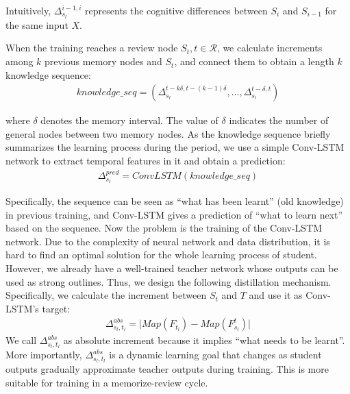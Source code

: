 \documentclass[letterpaper]{article} %
\begin{document}
Intuitively, $\Delta^{i-1,i}_{s_{l}}$ represents the cognitive differences between $S_{i}$ and $S_{i-1}$ for the same input $X$. 

When the training reaches a review node $S_{t},t\in\mathcal{R}$, we calculate increments among $k$ previous memory nodes and $S_{t}$, and connect them to obtain a length $k$ knowledge sequence:
\begin{align}
    knowledge\_seq = (\Delta^{t-k\delta,t-(k-1)\delta}_{s_{l}},\dots,\Delta^{t-\delta,t}_{s_{l}})
\end{align}


\noindent where $\delta$ denotes the memory interval. The value of $\delta$ indicates the number of general nodes between two memory nodes. As the knowledge sequence briefly summarizes the learning process during the period, we use a simple Conv-LSTM network to extract temporal features in it and obtain a prediction:  
\begin{align}
    \Delta_{s_{l}}^{pred} = ConvLSTM(knowledge\_seq)
\end{align}

Specifically, the sequence can be seen as ``what has been learnt'' (old knowledge) in previous training, and Conv-LSTM gives a prediction of ``what to learn next'' based on the sequence. Now the problem is the training of the Conv-LSTM network. Due to the complexity of neural network and data distribution, it is hard to find an optimal solution for the whole learning process of student. However, we already have a well-trained teacher network whose outputs can be used as strong outlines. Thus, we design the following distillation mechanism. Specifically, we calculate the increment between $S_{t}$ and $T$ and use it as Conv-LSTM's target:
\begin{align}
    \Delta^{abs}_{s_{l},t_{l}} = \Big|Map(F_{t_{l}})-Map(F_{s_{l}}^{t})\Big|
\end{align}
We call $\Delta^{abs}_{s_{l},t_{l}}$ as absolute increment because it implies ``what needs to be learnt''. More importantly, $\Delta^{abs}_{s_{l},t_{l}}$ is a dynamic learning goal that changes as student outputs gradually approximate teacher outputs during training. This is more suitable for training in a memorize-review cycle.
\end{document}
